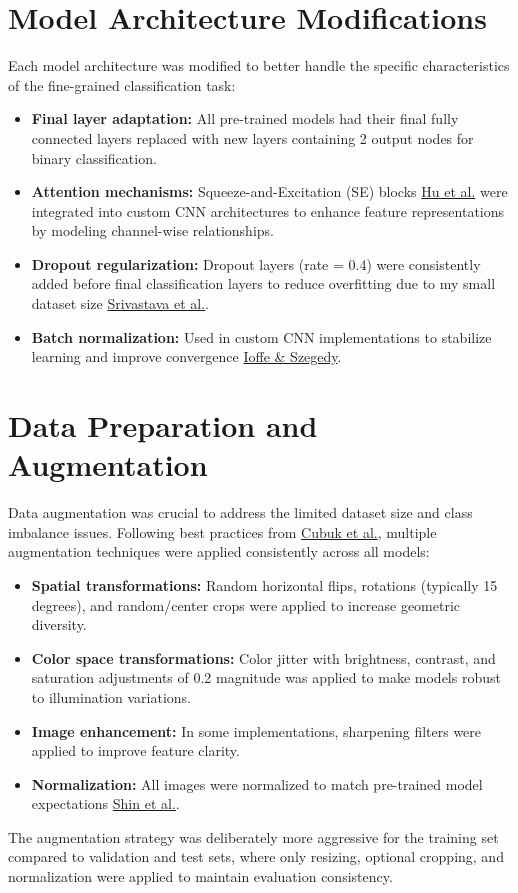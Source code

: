 \documentclass[a4paper,12pt]{article}
\begin{document}
\section{Model Architecture Modifications}
Each model architecture was modified to better handle the specific characteristics of the fine-grained classification task:
\begin{itemize}
\item \textbf{Final layer adaptation:} All pre-trained models had their final fully connected layers replaced with new layers containing 2 output nodes for binary classification.
\item \textbf{Attention mechanisms:} Squeeze-and-Excitation (SE) blocks \href{https://arxiv.org/abs/1709.01507}{Hu et al.} were integrated into custom CNN architectures to enhance feature representations by modeling channel-wise relationships.
\item \textbf{Dropout regularization:} Dropout layers (rate = 0.4) were consistently added before final classification layers to reduce overfitting due to my small dataset size \href{https://www.jmlr.org/papers/volume15/srivastava14a/srivastava14a.pdf}{Srivastava et al.}.
\item \textbf{Batch normalization:} Used in custom CNN implementations to stabilize learning and improve convergence \href{https://arxiv.org/abs/1502.03167}{Ioffe & Szegedy}.
\end{itemize}


\section{Data Preparation and Augmentation}
Data augmentation was crucial to address the limited dataset size and class imbalance issues. Following best practices from \href{https://arxiv.org/abs/1712.04621}{Cubuk et al.}, multiple augmentation techniques were applied consistently across all models:
\begin{itemize}
\item \textbf{Spatial transformations:} Random horizontal flips, rotations (typically 15 degrees), and random/center crops were applied to increase 
geometric diversity.
\item \textbf{Color space transformations:} Color jitter with brightness, contrast, and saturation adjustments of 0.2 magnitude was applied to make models robust to illumination variations.
\item \textbf{Image enhancement:} In some implementations, sharpening filters were applied to improve feature clarity.
\item \textbf{Normalization:} All images were normalized to match pre-trained model expectations \href{https://arxiv.org/abs/1803.08494}{Shin et al.}.
\end{itemize}
The augmentation strategy was deliberately more aggressive for the training set compared to validation and test sets, where only resizing, optional cropping, and normalization were applied to maintain evaluation consistency.
\end{document}
